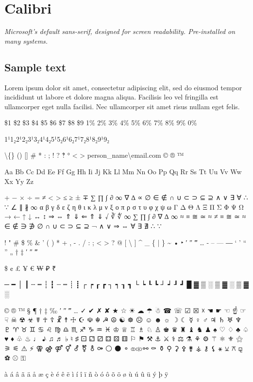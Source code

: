\section{Calibri}
\emph{Microsoft’s default sans-serif, designed for screen readability. Pre-installed on many systems.}
\begin{raggedright}
\section*{Sample text}
Lorem ipsum dolor sit amet, consectetur adipiscing elit, sed do eiusmod tempor incididunt ut labore et dolore magna aliqua. Facilisis leo vel fringilla est ullamcorper eget nulla facilisi. Nec ullamcorper sit amet risus nullam eget felis.

\$1 \$2 \$3 \$4 \$5 \$6 \$7 \$8 \$9 1\% 2\% 3\% 4\% 5\% 6\% 7\% 8\% 9\% 0\%

1¹1₂2¹2₂3¹3₂4¹4₂5¹5₂6¹6₂7¹7₂8¹8₂9¹9₂

\textbackslash\{\} () [] \# * : ; ! ? ‽ ° \textless{} \textgreater{} person\_name\textbackslash{}email.com © ® ™

Aa Bb Cc Dd Ee Ff Gg Hh Ii Jj Kk Ll Mm Nn Oo Pp Qq Rr Ss Tt Uu Vv Ww Xx Yy Zz

+ − × ÷ = ≠ < > ≤ ≥ ± ∓
∑ ∏ ∫ ∂ ∞ ∇ ∆ ∝ ∅ ∈ ∉ ∩ ∪ ⊂ ⊃ ⊆ ⊇ ∧ ∨ ∃ ∀ ∴ ∵ ∠ ∥ ∦ ∞
α β γ δ ε ζ η θ ι κ λ μ ν ξ ο π ρ σ τ υ φ χ ψ ω
Γ Δ Θ Λ Ξ Π Σ Φ Ψ Ω
→ ← ↑ ↓ ↔ ↕ ⇒ ⇔ ⇑ ⇓ ⇐ ⇑ ⇓
√ ∛ ∜ ∞ ∑ ∏ ∫ ∂ ∇ ∆ ∞ ≈ ≡ ≅ ≃ ≈ ≠ ≡ ≅ ≃ ≈
∈ ∉ ∋ ∌ ∅ ∩ ∪ ⊂ ⊃ ⊆ ⊇
¬ ∧ ∨ ⇒ ⇔ ∀ ∃ ∄ ∴ ∵

! " \# \$ \% \& ' ( ) * + , - . / : ; \textless{} \textgreater{} ? @ [ \textbackslash{} ] \^{} \_ \{ | \} \~{}
• ‣ ′ ″ ‴ … ‐ – — ― ‘ ’ “ ” „ † ‡ ′ ″ ‴

\$ ¢ £ ¥ € ₩ ₽ ₹

─ ━ │ ┃ ┄ ┅ ┆ ┇ ┈ ┉ ┊ ┋ ┌ ┍ ┎ ┏ ┐ ┑ ┒ ┓ └ ┕ ┖ ┗ ┘ ┙ ┚ ┛
█ ▓ ▒ ░ ▒ ▓ ░ ▒ ▓ ░

© ® ™ § ¶ † ‡ ‰ ′ ″ ‴ … ✓ ✔ ✗ ✘ ★ ☆ ☀ ☁ ☂ ☃ ☎ ☏ ☑ ☒ ☓ ☚ ☛ ☜ ☝ ☞ ☟ ☠ ☢ ☣ ☤ ☥ ☦ ☧ ☨ ☩ ☪ ☫ ☬ ☭ ☮ ☯ ☸ ☹ ☺ ☻ ☼ ☽ ☾ ☿ ♀ ♂ ♃ ♄ ♅ ♆ ♇ ♈ ♉ ♊ ♋ ♌ ♍ ♎ ♏ ♐ ♑ ♒ ♓ ♔ ♕ ♖ ♗ ♘ ♙ ♚ ♛ ♜ ♝ ♞ ♟ ♠ ♡ ♢ ♣ ♤ ♥ ♦ ♧ ♨ ♩ ♪ ♫ ♬ ♭ ♮ ♯ ⚀ ⚁ ⚂ ⚃ ⚄ ⚅ ⚐ ⚑ ⚒ ⚓ ⚔ ⚕ ⚖ ⚗ ⚘ ⚙ ⚚ ⚛ ⚜ ⚝ ⚞ ⚟ ⚠ ⚡ ⚢ ⚣ ⚤ ⚥ ⚦ ⚧ ⚨ ⚩ ⚪ ⚫ ⚬ ⚭ ⚮ ⚯ ⚰ ⚱ ⚲ ⚳ ⚴ ⚵ ⚶ ⚷ ⚸ ⚹ ⚺ ⚻ ⚼ ⚽ ⚾ ⚿

à á â ã ä å æ ç è é ê ë ì í î ï ñ ò ó ô õ ö ø ù ú û ü ý þ ÿ
\end{raggedright}


